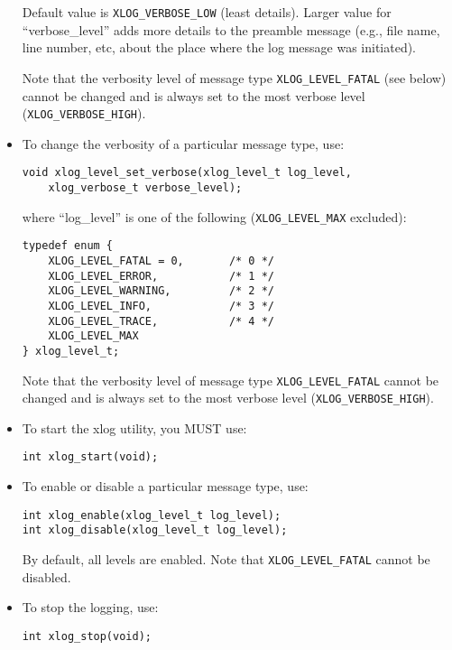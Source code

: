 \documentclass[11pt]{article}
\begin{document}
\begin{itemize}
   Default value is \verb=XLOG_VERBOSE_LOW= (least details).
   Larger value for ``verbose\_level'' adds more details to the
   preamble message (e.g., file name, line number, etc, about the place
   where the log message was initiated).

   Note that the verbosity level of message type \verb=XLOG_LEVEL_FATAL= (see
   below) cannot be changed and is always set to the most verbose level
   (\verb=XLOG_VERBOSE_HIGH=).

  \item To change the verbosity of a particular message type, use:

\begin{verbatim}
void xlog_level_set_verbose(xlog_level_t log_level,
	xlog_verbose_t verbose_level);
\end{verbatim}

where ``log\_level'' is one of the following (\verb=XLOG_LEVEL_MAX=
excluded):

\begin{verbatim}
typedef enum {
    XLOG_LEVEL_FATAL = 0,       /* 0 */
    XLOG_LEVEL_ERROR,           /* 1 */
    XLOG_LEVEL_WARNING,         /* 2 */
    XLOG_LEVEL_INFO,            /* 3 */
    XLOG_LEVEL_TRACE,           /* 4 */
    XLOG_LEVEL_MAX
} xlog_level_t;
\end{verbatim}

   Note that the verbosity level of message type \verb=XLOG_LEVEL_FATAL=
   cannot be changed and is always set to the most verbose level
   (\verb=XLOG_VERBOSE_HIGH=).

  \item To start the xlog utility, you MUST use:

\begin{verbatim}
int xlog_start(void);
\end{verbatim}


  \item To enable or disable a particular message type, use:

\begin{verbatim}
int xlog_enable(xlog_level_t log_level);
int xlog_disable(xlog_level_t log_level);
\end{verbatim}

	By default, all levels are enabled.
	Note that \verb=XLOG_LEVEL_FATAL= cannot be disabled.

  \item To stop the logging, use:

\begin{verbatim}
int xlog_stop(void);
\end{verbatim}


\end{itemize}
\end{document}
